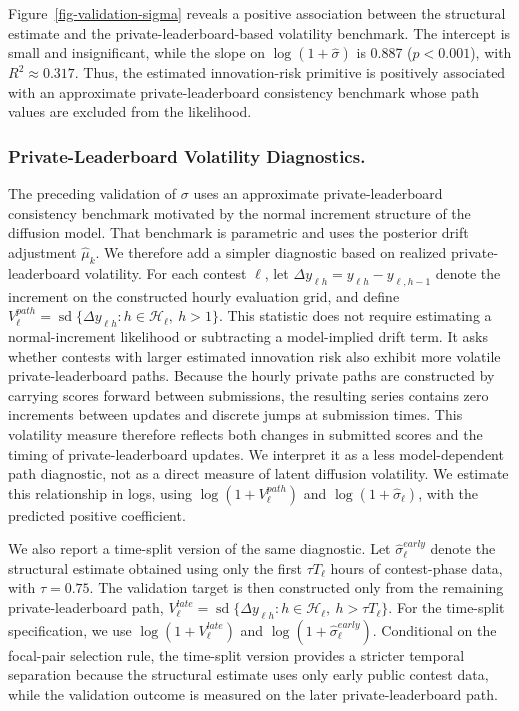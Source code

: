 \documentclass[mnsc]{informs3}
\begin{document}
Figure~\ref{fig-validation-sigma} reveals a positive association between the structural estimate and the private-leaderboard-based volatility benchmark.
The intercept is small and insignificant, while the slope on $\log(1+\hat{\sigma})$ is 0.887 ($p<0.001$), with $R^2\approx0.317$.
Thus, the estimated innovation-risk primitive is positively associated with an approximate private-leaderboard consistency benchmark whose path values are excluded from the likelihood.

\subsubsection{Private-Leaderboard Volatility Diagnostics.}
The preceding validation of $\sigma$ uses an approximate private-leaderboard consistency benchmark motivated by the normal increment structure of the diffusion model.
That benchmark is parametric and uses the posterior drift adjustment $\hat\mu_k$.
We therefore add a simpler diagnostic based on realized private-leaderboard volatility.
For each contest $\ell$, let $\Delta y_{\ell h}=y_{\ell h}-y_{\ell,h-1}$ denote the increment on the constructed hourly evaluation grid, and define $V_\ell^{path}=\operatorname{sd}\{\Delta y_{\ell h}:h\in\mathcal H_\ell,\ h>1\}$.
This statistic does not require estimating a normal-increment likelihood or subtracting a model-implied drift term.
It asks whether contests with larger estimated innovation risk also exhibit more volatile private-leaderboard paths.
Because the hourly private paths are constructed by carrying scores forward between submissions, the resulting series contains zero increments between updates and discrete jumps at submission times. This volatility measure therefore reflects both changes in submitted scores and the timing of private-leaderboard updates. We interpret it as a less model-dependent path diagnostic, not as a direct measure of latent diffusion volatility.
We estimate this relationship in logs, using $\log(1+V_\ell^{path})$ and $\log(1+\hat\sigma_\ell)$, with the predicted positive coefficient.

We also report a time-split version of the same diagnostic.
Let $\hat\sigma_\ell^{early}$ denote the structural estimate obtained using only the first $\tau T_\ell$ hours of contest-phase data, with $\tau=0.75$.
The validation target is then constructed only from the remaining private-leaderboard path, $V_\ell^{late}=\operatorname{sd}\{\Delta y_{\ell h}:h\in\mathcal H_\ell,\ h>\tau T_\ell\}$.
For the time-split specification, we use $\log(1+V_\ell^{late})$ and $\log(1+\hat\sigma_\ell^{early})$.
Conditional on the focal-pair selection rule, the time-split version provides a stricter temporal separation because the structural estimate uses only early public contest data, while the validation outcome is measured on the later private-leaderboard path.
\end{document}
